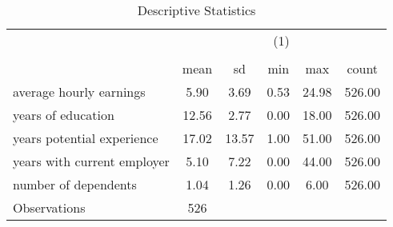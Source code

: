 \begin{table}[htbp]\centering
\def\sym#1{\ifmmode^{#1}\else\(^{#1}\)\fi}
\caption{Descriptive Statistics}
\begin{tabular}{l*{1}{ccccc}}
\toprule
                    &\multicolumn{5}{c}{(1)}                                         \\
                    &\multicolumn{5}{c}{}                                            \\
                    &        mean&          sd&         min&         max&       count\\
\midrule
average hourly earnings&        5.90&        3.69&        0.53&       24.98&      526.00\\
years of education  &       12.56&        2.77&        0.00&       18.00&      526.00\\
years potential experience&       17.02&       13.57&        1.00&       51.00&      526.00\\
years with current employer&        5.10&        7.22&        0.00&       44.00&      526.00\\
number of dependents&        1.04&        1.26&        0.00&        6.00&      526.00\\
\midrule
Observations        &         526&            &            &            &            \\
\bottomrule
\end{tabular}
\end{table}
